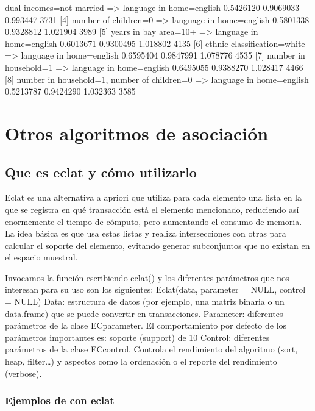\documentclass [a4paper] {article}
\begin{document}
\begin{Schunk}
\begin{Soutput}
[3] {dual incomes=not married}    => {language in home=english} 0.5426120  0.9069033 0.993447  3731
[4] {number of children=0}        => {language in home=english} 0.5801338  0.9328812 1.021904  3989
[5] {years in bay area=10+}       => {language in home=english} 0.6013671  0.9300495 1.018802  4135
[6] {ethnic classification=white} => {language in home=english} 0.6595404  0.9847991 1.078776  4535
[7] {number in household=1}       => {language in home=english} 0.6495055  0.9388270 1.028417  4466
[8] {number in household=1,                                                                        
     number of children=0}        => {language in home=english} 0.5213787  0.9424290 1.032363  3585
\end{Soutput}
\end{Schunk}


\section{Otros algoritmos de asociación}

\subsection{Que es eclat y cómo utilizarlo}
Eclat es una alternativa a apriori que utiliza para cada elemento una lista en la que se registra en qué transacción está el 
elemento mencionado, reduciendo así enormemente el tiempo de cómputo, pero aumentando el consumo de memoria. La idea básica 
es que usa estas listas y realiza intersecciones con otras para calcular el soporte del elemento, evitando generar subconjuntos 
que no existan en el espacio muestral.

Invocamos la función escribiendo eclat() y los diferentes parámetros que nos interesan para su uso son los siguientes:
Eclat(data, parameter = NULL,  control = NULL)
Data: estructura de datos (por ejemplo, una matriz binaria o un data.frame) que se puede convertir en transacciones.
Parameter: diferentes parámetros de la clase ECparameter. El comportamiento por defecto de los parámetros importantes es: soporte (support) de 10%
Control: diferentes parámetros de la clase ECcontrol. Controla el rendimiento del algoritmo (sort, heap, filter…) y aspectos como la ordenación o el reporte del rendimiento (verbose).

\subsubsection{Ejemplos de con eclat}
\end{document}
